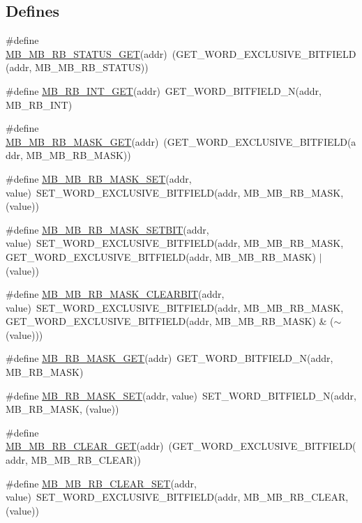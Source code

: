 \subsection*{Defines}
\begin{DoxyCompactItemize}
\item 
\#define \hyperlink{a00561_abf54c2ff768d284b1c748e97e1ca6ade}{MB\_\-MB\_\-RB\_\-STATUS\_\-GET}(addr)~(GET\_\-WORD\_\-EXCLUSIVE\_\-BITFIELD(addr, MB\_\-MB\_\-RB\_\-STATUS))
\item 
\#define \hyperlink{a00561_a3efb0b573c2ca933bf9194949d8bb53d}{MB\_\-RB\_\-INT\_\-GET}(addr)~GET\_\-WORD\_\-BITFIELD\_\-N(addr, MB\_\-RB\_\-INT)
\item 
\#define \hyperlink{a00561_a4e1f89aa5fda47daf3ef56a83b605c74}{MB\_\-MB\_\-RB\_\-MASK\_\-GET}(addr)~(GET\_\-WORD\_\-EXCLUSIVE\_\-BITFIELD(addr, MB\_\-MB\_\-RB\_\-MASK))
\item 
\#define \hyperlink{a00561_a8837c2e83b27bdbb6576b1b49929a6a4}{MB\_\-MB\_\-RB\_\-MASK\_\-SET}(addr, value)~SET\_\-WORD\_\-EXCLUSIVE\_\-BITFIELD(addr, MB\_\-MB\_\-RB\_\-MASK, (value))
\item 
\#define \hyperlink{a00561_a82823da92e8b89a041e10b0c92f7b05a}{MB\_\-MB\_\-RB\_\-MASK\_\-SETBIT}(addr, value)~SET\_\-WORD\_\-EXCLUSIVE\_\-BITFIELD(addr, MB\_\-MB\_\-RB\_\-MASK, GET\_\-WORD\_\-EXCLUSIVE\_\-BITFIELD(addr, MB\_\-MB\_\-RB\_\-MASK) $|$ (value))
\item 
\#define \hyperlink{a00561_afe4a5eedbde041cb5dcde82d05044bfc}{MB\_\-MB\_\-RB\_\-MASK\_\-CLEARBIT}(addr, value)~SET\_\-WORD\_\-EXCLUSIVE\_\-BITFIELD(addr, MB\_\-MB\_\-RB\_\-MASK, GET\_\-WORD\_\-EXCLUSIVE\_\-BITFIELD(addr, MB\_\-MB\_\-RB\_\-MASK) \& ($\sim$(value)))
\item 
\#define \hyperlink{a00561_a00c8e571d6b1b4331d0f43873b6dea5f}{MB\_\-RB\_\-MASK\_\-GET}(addr)~GET\_\-WORD\_\-BITFIELD\_\-N(addr, MB\_\-RB\_\-MASK)
\item 
\#define \hyperlink{a00561_ab1f1749786514fdb89ebc9e918a58f7c}{MB\_\-RB\_\-MASK\_\-SET}(addr, value)~SET\_\-WORD\_\-BITFIELD\_\-N(addr, MB\_\-RB\_\-MASK, (value))
\item 
\#define \hyperlink{a00561_ad5886f8e3f9cb36360685f5b3d0d6a66}{MB\_\-MB\_\-RB\_\-CLEAR\_\-GET}(addr)~(GET\_\-WORD\_\-EXCLUSIVE\_\-BITFIELD(addr, MB\_\-MB\_\-RB\_\-CLEAR))
\item 
\#define \hyperlink{a00561_a622074e4d5abec53ebf2379a552da691}{MB\_\-MB\_\-RB\_\-CLEAR\_\-SET}(addr, value)~SET\_\-WORD\_\-EXCLUSIVE\_\-BITFIELD(addr, MB\_\-MB\_\-RB\_\-CLEAR, (value))
\item 

\end{DoxyCompactItemize}
